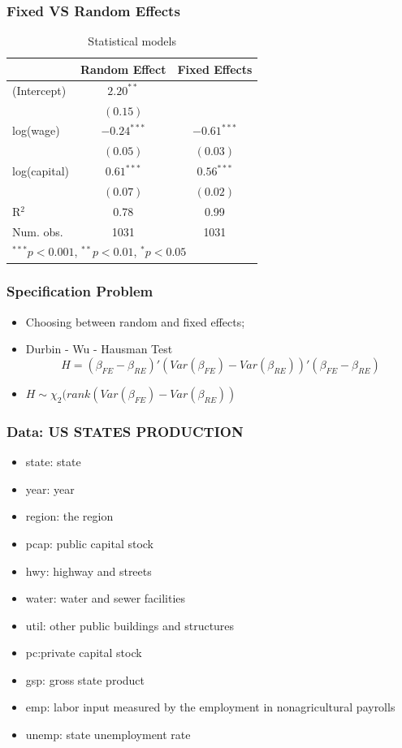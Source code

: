 \documentclass{beamer}
\newcommand{\1}{\mathbb{1}}
\begin{document}
\begin{frame}\frametitle{Fixed VS Random Effects}
\begin{table}
\footnotesize
\begin{center}
\begin{tabular}{l c c }
\hline
  & Random Effect & Fixed Effects \\
\hline
(Intercept)  & $2.20^{**}$   &       \\
             &  $(0.15)$     &       \\
log(wage)    & $-0.24^{***}$ &  $-0.61^{***}$             \\
             & $(0.05)$      &   $(0.03)$            \\
log(capital) & $0.61^{***}$  &  $0.56^{***}$            \\
             & $(0.07)$      &  $(0.02)$             \\
\hline
R$^2$        & 0.78          & 0.99          \\
Num. obs.    & 1031          & 1031          \\
\hline
\multicolumn{3}{l}{\scriptsize{$^{***}p<0.001$, $^{**}p<0.01$, $^*p<0.05$}}
\end{tabular}
\caption{Statistical models}
\label{table:coefficients}
\end{center}
\end{table}
\end{frame}

\begin{frame}\frametitle{Specification Problem}
\begin{itemize}
\item Choosing between random and fixed effects;
\item Durbin - Wu - Hausman Test 
\begin{equation}
H = (\beta_{FE} - \beta_{RE})' (Var(\beta_{FE}) - Var(\beta_{RE}))' (\beta_{FE} - \beta_{RE}) 
\end{equation}
\item $H \sim \chi_2(rank(Var(\beta_{FE}) - Var(\beta_{RE}))$
\end{itemize}
\end{frame}

\begin{frame}\frametitle{Data: US STATES PRODUCTION}
\begin{itemize}
\item state: state
\item year: year
\item region: the region
\item pcap: public capital stock
\item hwy: highway and streets
\item water: water and sewer facilities
\item util: other public buildings and structures
\item pc:private capital stock
\item gsp: gross state product
\item emp: labor input measured by the employment in nonagricultural payrolls
\item unemp: state unemployment rate
\end{itemize}
\end{frame}
\end{document}
